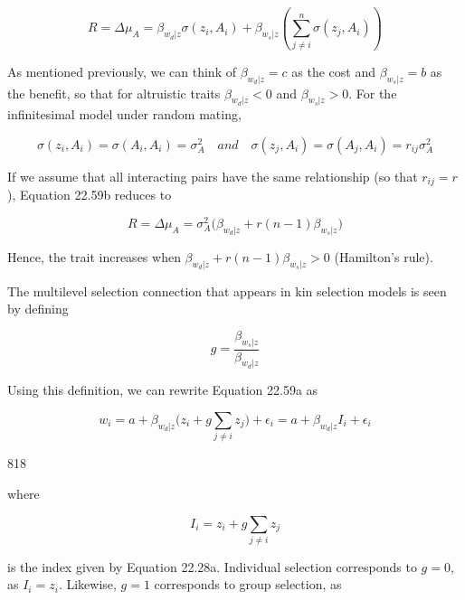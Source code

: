 \documentclass{article}
\begin{document}
\begin{equation}
R=\Delta\mu_{A}=\beta_{w_{d}|z}\sigma(z_{i},A_{i})+\beta_{w_{s}|z}\left(\sum_{j\neq i}^{n}\sigma(z_{j},A_{i})\right)
\tag{22.59b}
\label{eq:22_59b}
\end{equation}

As mentioned previously, we can think of  $ \beta_{w_d|z} = c $ as the cost and  $ \beta_{w_s|z} = b $ as the benefit, so that for altruistic traits  $ \beta_{w_d|z} < 0 $ and  $ \beta_{w_s|z} > 0 $. For the infinitesimal model under random mating,

\begin{equation}
\sigma(z_{i},A_{i})=\sigma(A_{i},A_{i})=\sigma_{A}^{2}\quad and\quad\sigma(z_{j},A_{i})=\sigma(A_{j},A_{i})=r_{ij}\sigma_{A}^{2}
\end{equation}

If we assume that all interacting pairs have the same relationship (so that  $ r_{ij} = r $), Equation 22.59b reduces to

\begin{equation}
R=\Delta\mu_{A}=\sigma_{A}^{2}\Biggl(\beta_{w_{d}|z}+r(n-1)\beta_{w_{s}|z}\Biggr)
\tag{22.59c}
\label{eq:22_59c}
\end{equation}

Hence, the trait increases when  $ \beta_{w_d|z} + r(n - 1)\beta_{w_s|z} > 0 $ (Hamilton's rule).

The multilevel selection connection that appears in kin selection models is seen by defining

\begin{equation}
g=\frac{\beta_{w_{s}|z}}{\beta_{w_{d}|z}}
\tag{22.60a}
\label{eq:22_60a}
\end{equation}

Using this definition, we can rewrite Equation 22.59a as

\begin{equation}
w_{i}=a+\beta_{w_{d}|z}\Bigg(z_{i}+g\sum_{j\neq i}z_{j}\Bigg)+\epsilon_{i}=a+\beta_{w_{d}|z}I_{i}+\epsilon_{i}
\tag{22.60b}
\label{eq:22_60b}
\end{equation}

818

where

\begin{equation}
I_{i}=z_{i}+g\sum_{j\neq i}z_{j}
\end{equation}

is the index given by Equation 22.28a. Individual selection corresponds to  $ g = 0 $, as  $ I_i = z_i $. Likewise,  $ g = 1 $ corresponds to group selection, as
\end{document}
